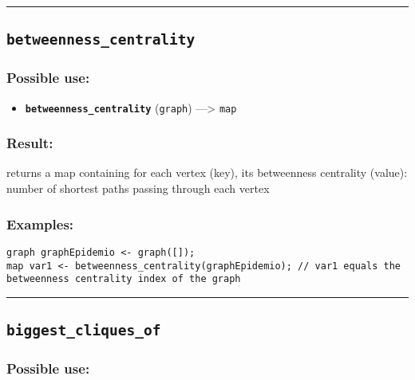 \documentclass[]{book}
\providecommand{\tightlist}{%
  \setlength{\itemsep}{0pt}\setlength{\parskip}{0pt}}
\theoremstyle{definition}
\theoremstyle{definition}
\theoremstyle{definition}
\theoremstyle{remark}
\begin{document}
\begin{center}\rule{0.5\linewidth}{\linethickness}\end{center}

\subsection{\texorpdfstring{\texttt{betweenness\_centrality}}{betweenness\_centrality}}\label{betweenness_centrality}

\subsubsection{Possible use:}\label{possible-use-68}

\begin{itemize}
\tightlist
\item
  \textbf{\texttt{betweenness\_centrality}} (\texttt{graph})
  ---\textgreater{} \texttt{map}
\end{itemize}

\subsubsection{Result:}\label{result-67}

returns a map containing for each vertex (key), its betweenness
centrality (value): number of shortest paths passing through each vertex

\subsubsection{Examples:}\label{examples-54}

\begin{verbatim}
graph graphEpidemio <- graph([]);  
map var1 <- betweenness_centrality(graphEpidemio); // var1 equals the betweenness centrality index of the graph
\end{verbatim}

\begin{center}\rule{0.5\linewidth}{\linethickness}\end{center}

\subsection{\texorpdfstring{\texttt{biggest\_cliques\_of}}{biggest\_cliques\_of}}\label{biggest_cliques_of}

\subsubsection{Possible use:}\label{possible-use-69}
\end{document}
